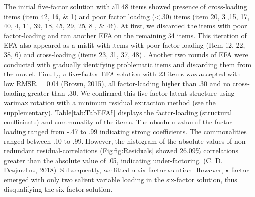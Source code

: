 \documentclass[
  english,
  man]{apa6}
\begin{document}
The initial five-factor solution with all 48 items showed presence of cross-loading items (item 42, 16, \& 1) and poor factor loading (\textless.30) items (item 20, 3 ,15, 17, 40, 4, 11, 39, 18, 45, 29, 25, 8 , \& 46). At first, we discarded the items with poor factor-loading and ran another EFA on the remaining 34 items. This iteration of EFA also appeared as a misfit with items with poor factor-loading (Item 12, 22, 38, 6) and cross-loading (items 23, 31, 37, 48) . Another two rounds of EFA were conducted with gradually identifying problematic items and discarding them from the model. Finally, a five-factor EFA solution with 23 items was accepted with low RMSR = 0.04 (Brown, 2015), all factor-loading higher than .30 and no cross-loading greater than .30. We confirmed this five-factor latent structure using varimax rotation with a minimum residual extraction method (see the supplementary). Table\ref{tab:TabEFA5} displays the factor-loading (structural coefficients) and communality of the items. The absolute value of the factor-loading ranged from -.47 to .99 indicating strong coefficients. The commonalities ranged between .10 to .99. However, the histogram of the absolute values of non-redundant residual-correlations (Fig\ref{fig:Residuals} showed 26.09\% correlations greater than the absolute value of .05, indicating under-factoring. (C. D. Desjardins, 2018). Subsequently, we fitted a six-factor solution. However, a factor emerged with only two salient variable loading in the six-factor solution, thus disqualifying the six-factor solution.
\end{document}

